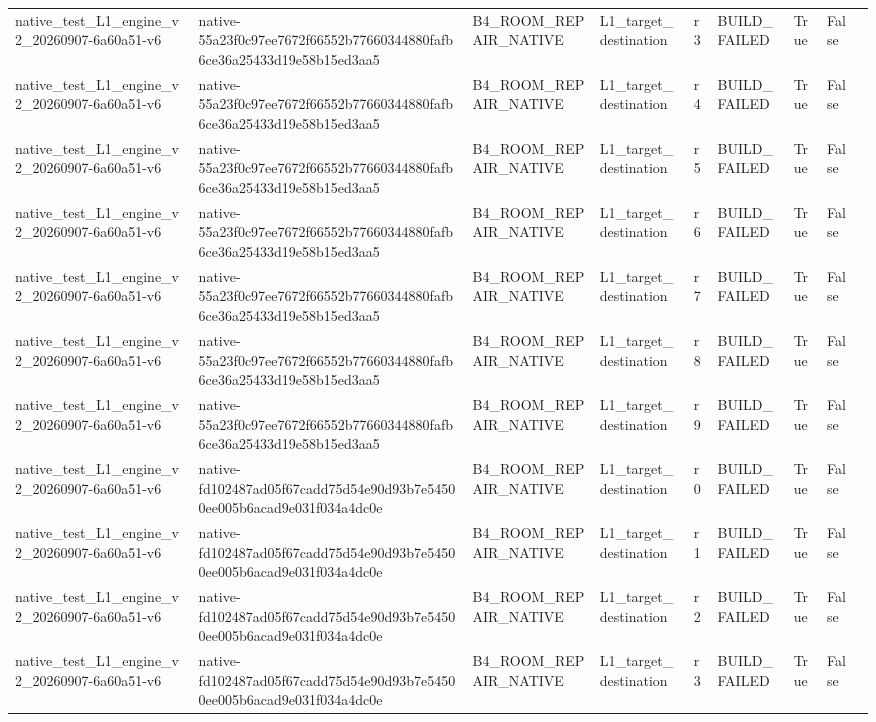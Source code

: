 \begin{tabular}{lllllllll}
native\_test\_L1\_engine\_v2\_20260907-6a60a51-v6 & native-55a23f0c97ee7672f66552b77660344880fafb6ce36a25433d19e58b15ed3aa5 & B4\_ROOM\_REPAIR\_NATIVE & L1\_target\_destination & r3 & BUILD\_FAILED & True & False &  \\
native\_test\_L1\_engine\_v2\_20260907-6a60a51-v6 & native-55a23f0c97ee7672f66552b77660344880fafb6ce36a25433d19e58b15ed3aa5 & B4\_ROOM\_REPAIR\_NATIVE & L1\_target\_destination & r4 & BUILD\_FAILED & True & False &  \\
native\_test\_L1\_engine\_v2\_20260907-6a60a51-v6 & native-55a23f0c97ee7672f66552b77660344880fafb6ce36a25433d19e58b15ed3aa5 & B4\_ROOM\_REPAIR\_NATIVE & L1\_target\_destination & r5 & BUILD\_FAILED & True & False &  \\
native\_test\_L1\_engine\_v2\_20260907-6a60a51-v6 & native-55a23f0c97ee7672f66552b77660344880fafb6ce36a25433d19e58b15ed3aa5 & B4\_ROOM\_REPAIR\_NATIVE & L1\_target\_destination & r6 & BUILD\_FAILED & True & False &  \\
native\_test\_L1\_engine\_v2\_20260907-6a60a51-v6 & native-55a23f0c97ee7672f66552b77660344880fafb6ce36a25433d19e58b15ed3aa5 & B4\_ROOM\_REPAIR\_NATIVE & L1\_target\_destination & r7 & BUILD\_FAILED & True & False &  \\
native\_test\_L1\_engine\_v2\_20260907-6a60a51-v6 & native-55a23f0c97ee7672f66552b77660344880fafb6ce36a25433d19e58b15ed3aa5 & B4\_ROOM\_REPAIR\_NATIVE & L1\_target\_destination & r8 & BUILD\_FAILED & True & False &  \\
native\_test\_L1\_engine\_v2\_20260907-6a60a51-v6 & native-55a23f0c97ee7672f66552b77660344880fafb6ce36a25433d19e58b15ed3aa5 & B4\_ROOM\_REPAIR\_NATIVE & L1\_target\_destination & r9 & BUILD\_FAILED & True & False &  \\
native\_test\_L1\_engine\_v2\_20260907-6a60a51-v6 & native-fd102487ad05f67cadd75d54e90d93b7e54500ee005b6acad9e031f034a4dc0e & B4\_ROOM\_REPAIR\_NATIVE & L1\_target\_destination & r0 & BUILD\_FAILED & True & False &  \\
native\_test\_L1\_engine\_v2\_20260907-6a60a51-v6 & native-fd102487ad05f67cadd75d54e90d93b7e54500ee005b6acad9e031f034a4dc0e & B4\_ROOM\_REPAIR\_NATIVE & L1\_target\_destination & r1 & BUILD\_FAILED & True & False &  \\
native\_test\_L1\_engine\_v2\_20260907-6a60a51-v6 & native-fd102487ad05f67cadd75d54e90d93b7e54500ee005b6acad9e031f034a4dc0e & B4\_ROOM\_REPAIR\_NATIVE & L1\_target\_destination & r2 & BUILD\_FAILED & True & False &  \\
native\_test\_L1\_engine\_v2\_20260907-6a60a51-v6 & native-fd102487ad05f67cadd75d54e90d93b7e54500ee005b6acad9e031f034a4dc0e & B4\_ROOM\_REPAIR\_NATIVE & L1\_target\_destination & r3 & BUILD\_FAILED & True & False &  \\

\end{tabular}
